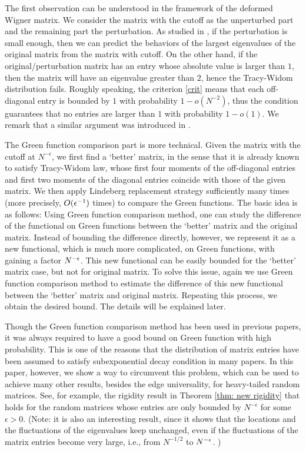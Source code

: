 The first observation can be understood in the framework of the deformed Wigner matrix. We consider the matrix with the cutoff as the unperturbed part and the remaining part the perturbation. As studied in \cite{BBaP, P, BV1, BV2, KY}, if the perturbation is small enough, then we can predict the behaviors of the largest eigenvalues of the original matrix from the matrix with cutoff. On the other hand, if the original/perturbation matrix has an entry whose absolute value is larger than $1$, then the matrix will have an eigenvalue greater than $2$, hence the Tracy-Widom distribution fails. Roughly speaking, the criterion \eqref{crit} means that each off-diagonal entry is bounded by $1$ with probability $1 - o(N^{-2})$, thus the condition guarantees that no entries are larger than $1$ with probability $1 - o(1)$. We remark that a similar argument was introduced in \cite{BBP}.

The Green function comparison part is more technical. Given the matrix with the cutoff at $N^{-\epsilon}$, we first find a `better' matrix, in the sense that it is already known to satisfy Tracy-Widom law, whose first four moments of the off-diagonal entries and first two moments of the diagonal entries coincide with those of the given matrix. We then apply Lindeberg replacement strategy sufficiently many times (more precisely, $O(\epsilon^{-1})$ times) to compare the Green functions. The basic idea is as follows: Using Green function comparison method, one can study the difference of the functional on Green functions between the `better' matrix and the original matrix. Instead of bounding the difference directly, however, we represent it as a new functional, which is much more complicated, on Green functions, with gaining a factor $N^{-\epsilon}$. This new functional can be easily bounded for the `better' matrix case, but not for original matrix. To solve this issue, again we use Green function comparison method to estimate the difference of this new functional between the `better' matrix and original matrix. Repeating this process, we obtain the desired bound. The details will be explained later.

Though the Green function comparison method has been used in previous papers, it was always required to have a good bound on Green function with high probability. This is one of the reasons that the distribution of matrix entries have been assumed to satisfy subexponential decay condition  in many papers. In this paper, however, we show a way to circumvent this problem, which can be used to achieve many other results, besides the edge universality, for heavy-tailed random matrices. See, for example, the rigidity result in Theorem \ref{thm: new rigidity} that holds for the random matrices whose entries are only bounded by $N^{-\epsilon}$ for some $\epsilon > 0$. {(Note: it is also an interesting result, since it shows that the locations and the fluctuations of the eigenvalues keep unchanged, even if the fluctuations of the matrix entries become very large, i.e., from $N^{-1/2}$ to $N^{-\epsilon}$. )}

